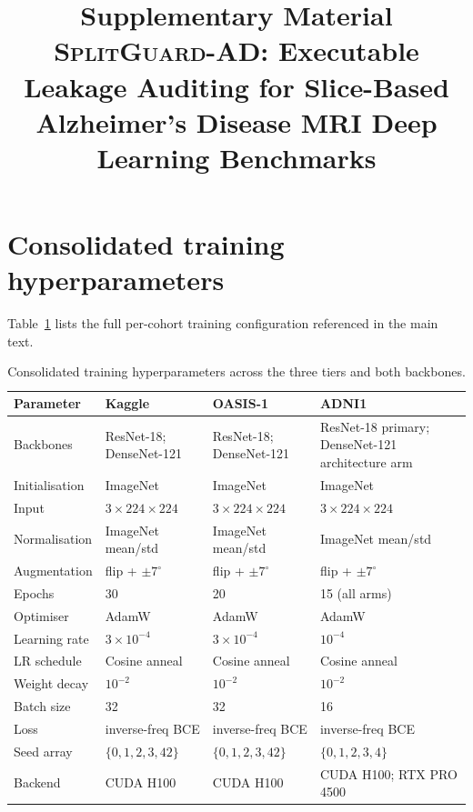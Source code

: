 \documentclass[11pt]{article}
\title{Supplementary Material \\
\textsc{SplitGuard-AD}: Executable Leakage Auditing for Slice-Based
Alzheimer's Disease MRI Deep Learning Benchmarks}
\author{}
\date{}
\begin{document}
\maketitle

\section{Consolidated training hyperparameters}
\label{sm:hyperparams}

Table~\ref{tab:sm_hyperparams} lists the full per-cohort training
configuration referenced in the main text.

\begin{table}[!ht]
\centering
\footnotesize
\caption{Consolidated training hyperparameters across the three
tiers and both backbones.}
\label{tab:sm_hyperparams}
\begin{tabular}{@{}p{3.2cm}p{3.3cm}p{3.3cm}p{4.3cm}@{}}
\toprule
Parameter & Kaggle & OASIS-1 & ADNI1 \\
\midrule
Backbones & ResNet-18; DenseNet-121 & ResNet-18; DenseNet-121 &
ResNet-18 primary; DenseNet-121 architecture arm \\
Initialisation & ImageNet & ImageNet & ImageNet \\
Input & $3\!\times\!224\!\times\!224$ & $3\!\times\!224\!\times\!224$ & $3\!\times\!224\!\times\!224$ \\
Normalisation & ImageNet mean/std & ImageNet mean/std & ImageNet mean/std \\
Augmentation & flip + $\pm 7^{\circ}$ & flip + $\pm 7^{\circ}$ & flip + $\pm 7^{\circ}$ \\
Epochs & 30 & 20 & 15 (all arms) \\
Optimiser & AdamW & AdamW & AdamW \\
Learning rate & $3\!\times\!10^{-4}$ & $3\!\times\!10^{-4}$ & $10^{-4}$ \\
LR schedule & Cosine anneal & Cosine anneal & Cosine anneal \\
Weight decay & $10^{-2}$ & $10^{-2}$ & $10^{-2}$ \\
Batch size & 32 & 32 & 16 \\
Loss & inverse-freq BCE & inverse-freq BCE & inverse-freq BCE \\
Seed array & $\{0,1,2,3,42\}$ & $\{0,1,2,3,42\}$ & $\{0,1,2,3,4\}$ \\
Backend & CUDA H100 & CUDA H100 & CUDA H100; RTX PRO 4500 \\

\end{tabular}
\end{table}
\end{document}
